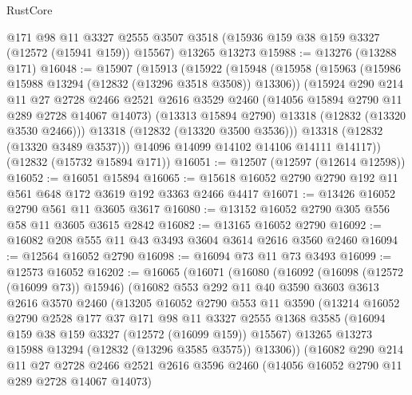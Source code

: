 \begin{lexlean}{RustCore}
\begin{coremodule}
    @171
    @98
    @11
    @3327
    @2555
    @3507
    @3518
    (@15936 @159 @38 @159 @3327 (@12572 (@15941 @159)) @15567)
    @13265
    @13273
@15988 := @13276 (@13288 @171)
@16048 := @15907
    (@15913
      (@15922
        (@15948
          (@15958
            (@15963 (@15986 @15988 @13294 (@12832 (@13296 @3518 @3508)) @13306))
            (@15924
              @290
              @214
              @11
              @27
              @2728
              @2466
              @2521
              @2616
              @3529
              @2460
              (@14056 @15894 @2790 @11 @289 @2728 @14067 @14073)
              (@13313 @15894 @2790)
              @13318
              (@12832 (@13320 @3530 @2466)))
            @13318
            (@12832 (@13320 @3500 @3536)))
          @13318
          (@12832 (@13320 @3489 @3537)))
        @14096
        @14099
        @14102
        @14106
        @14111
        @14117))
    (@12832 (@15732 @15894 @171))
@16051 := @12507 (@12597 (@12614 @12598))
@16052 := @16051 @15894
@16065 := @15618 @16052 @2790 @2790 @192 @11 @561 @648 @172 @3619 @192 @3363 @2466 @4417
@16071 := @13426 @16052 @2790 @561 @11 @3605 @3617
@16080 := @13152 @16052 @2790 @305 @556 @58 @11 @3605 @3615 @2842
@16082 := @13165 @16052 @2790
@16092 := @16082 @208 @555 @11 @43 @3493 @3604 @3614 @2616 @3560 @2460
@16094 := @12564 @16052 @2790
@16098 := @16094 @73 @11 @73 @3493
@16099 := @12573 @16052
@16202 := @16065
    (@16071
      (@16080
        (@16092
          (@16098 (@12572 (@16099 @73)) @15946)
          (@16082
            @553
            @292
            @11
            @40
            @3590
            @3603
            @3613
            @2616
            @3570
            @2460
            (@13205
              @16052
              @2790
              @553
              @11
              @3590
              (@13214
                @16052
                @2790
                @2528
                @177
                @37
                @171
                @98
                @11
                @3327
                @2555
                @1368
                @3585
                (@16094 @159 @38 @159 @3327 (@12572 (@16099 @159)) @15567)
                @13265
                @13273
                @15988
                @13294
                (@12832 (@13296 @3585 @3575))
                @13306))
            (@16082
              @290
              @214
              @11
              @27
              @2728
              @2466
              @2521
              @2616
              @3596
              @2460
              (@14056 @16052 @2790 @11 @289 @2728 @14067 @14073)

\end{coremodule}
\end{lexlean}
